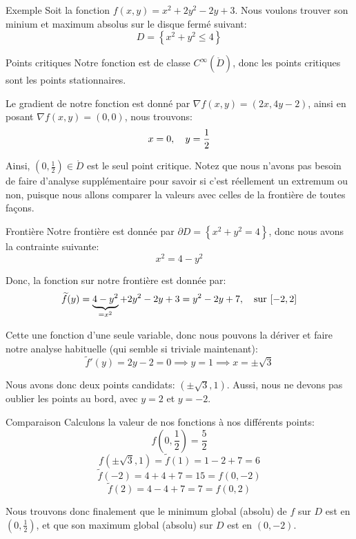 \documentclass[a4paper]{article}
\begin{document}
\begin{parag}{Exemple}
    Soit la fonction $f\left(x, y\right) = x^2 + 2y^2 - 2y + 3$. Nous voulons trouver son minium et maximum absolus sur le disque fermé suivant:  
    \[D = \left\{x^2 + y^2 \leq 4\right\}\]
    
    \begin{subparag}{Points critiques}
        Notre fonction est de classe $C^{\infty}\left(\mathring{D}\right)$, donc les points critiques sont les points stationnaires. 

        Le gradient de notre fonction est donné par $\nabla f\left(x, y\right) = \left(2x, 4y - 2\right)$, ainsi en posant $\nabla f\left(x, y\right) = \left(0, 0\right)$, nous trouvons: 
        \[x = 0, \quad y = \frac{1}{2}\]
        
        Ainsi, $\left(0, \frac{1}{2}\right) \in \mathring{D}$ est le seul point critique. Notez que nous n'avons pas besoin de faire d'analyse supplémentaire pour savoir si c'est réellement un extremum ou non, puisque nous allons comparer la valeurs avec celles de la frontière de toutes façons.
    \end{subparag}

    \begin{subparag}{Frontière}
        Notre frontière est donnée par $\partial D = \left\{x^2 + y^2 = 4\right\}$, donc nous avons la contrainte suivante: 
        \[x^2 = 4 - y^2\]

        Donc, la fonction sur notre frontière est donnée par: 
        \[\widetilde{f}\left(y\right) = \underbrace{4 - y^2}_{= x^2} + 2y^2 - 2y + 3 = y^2 - 2y + 7, \mathspace \text{sur } \left[-2, 2\right]\]
        
        Cette une fonction d'une seule variable, donc nous pouvons la dériver et faire notre analyse habituelle (qui semble si triviale maintenant): 
        \[\widetilde{f}'\left(y\right) = 2y - 2 = 0 \implies y = 1 \implies x = \pm \sqrt{3}\]
        
        Nous avons donc deux points candidats: $\left(\pm \sqrt{3}, 1\right)$. Aussi, nous ne devons pas oublier les points au bord, avec $y = 2$ et $y = -2$.
    \end{subparag}

    \begin{subparag}{Comparaison}
        Calculons la valeur de nos fonctions à nos différents points:  
        \[f\left(0, \frac{1}{2}\right) = \frac{5}{2}\]
        \[f\left(\pm \sqrt{3}, 1\right) = \widetilde{f}\left(1\right) = 1 - 2 + 7 = 6\] 
        \[\widetilde{f}\left(-2\right) = 4 + 4 + 7 = 15 = f\left(0, -2\right)\] 
        \[\widetilde{f}\left(2\right) = 4 - 4 + 7 = 7 = f\left(0, 2\right)\]
        
        Nous trouvons donc finalement que le minimum global (absolu) de $f$ sur $D$ est en $\left(0, \frac{1}{2}\right)$, et que son maximum global (absolu) sur $D$ est en $\left(0, -2\right)$.
        
    \end{subparag}
\end{parag}
\end{document}
